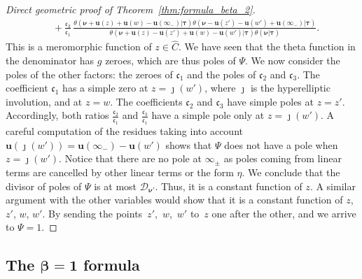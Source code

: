 \documentclass[pdftex]{sigma}
\numberwithin{equation}{section}
\begin{document}
\begin{proof}[Direct geometric proof of Theorem~\ref{thm:formula_beta_2}]
\begin{align*}
 &{}+ \frac{\mathfrak{c}_{3}}{\mathfrak{c}_1}\,\frac{\theta (\bm{\nu} +\bm{u}(z) + \bm{u}(w) - \bm{u}(\infty_-) |\bm{\tau} )\theta (\bm{\nu}- \bm{u}(z') - \bm{u}(w') + \bm{u}(\infty_-) |\bm{\tau} )}{\theta (\bm{\nu} + \bm{u}(z) - \bm{u}(z') + \bm{u}(w) - \bm{u}(w') |\bm{\tau} )\theta (\bm{\nu} |\bm{\tau} )}.
\end{align*}
This is a meromorphic function of $z \in \widehat{C}$. We have seen that the theta function in the denominator has $g$ zeroes,
which are thus poles of $\Psi$. We now consider the poles of the
 other factors: the zeroes of $\mathfrak{c}_{1}$ and the poles of
 $\mathfrak{c}_{2}$ and $\mathfrak{c}_{3}$. The coefficient $\mathfrak{c}_1$ has a simple zero at $z = \jmath(w')$, where $\jmath$ is the hyperelliptic involution, and at $z = w$. The coefficients $\mathfrak{c}_2$ and $\mathfrak{c}_3$ have simple poles at $z = z'$. Accordingly, both ratios $\frac{\mathfrak{c}_{2}}{\mathfrak{c}_{1}}$ and $\frac{\mathfrak{c}_{3}}{\mathfrak{c}_{1}}$ have a simple pole only at
 $z = \jmath(w')$. A careful computation of the residues taking into account $\bm{u}(\jmath(w')) = \bm{u}(\infty_-) - \bm{u}(w')$ shows that $\Psi$ does not have a pole when $z = \jmath(w')$. Notice that there are no pole at $\infty_{\pm}$ as poles coming from linear terms are cancelled by other linear terms or the form $\eta$.
 We conclude that the divisor of poles of $\Psi$ is at most $\mathcal{D}_{\bm{\nu}'}$. Thus, it is a constant function of $z$. A similar argument with the other variables would show that it is a constant function of $z$, $z'$, $w$, $w'$. By sending the points~$z'$,~$w$,~$w'$ to~$z$ one after the other, and we arrive to $\Psi = 1$.
\end{proof}

\subsection[The beta = 1 formula]{The $\boldsymbol{\beta = 1}$ formula}
\end{document}

